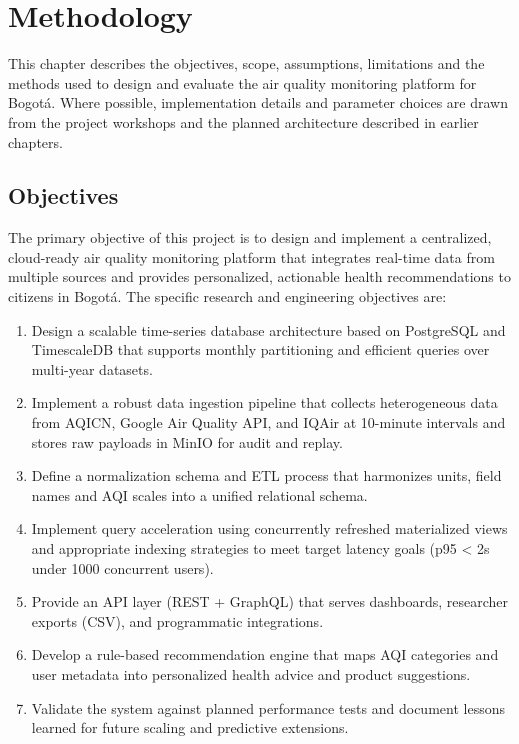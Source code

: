 \chapter{Methodology}
\label{ch:method} %

This chapter describes the objectives, scope, assumptions, limitations and the methods used to design and evaluate the air quality monitoring platform for Bogotá. Where possible, implementation details and parameter choices are drawn from the project workshops and the planned architecture described in earlier chapters.

\section{Objectives}
\label{sec:method_objectives}

The primary objective of this project is to design and implement a centralized, cloud-ready air quality monitoring platform that integrates real-time data from multiple sources and provides personalized, actionable health recommendations to citizens in Bogotá. The specific research and engineering objectives are:
\begin{enumerate}
    \item Design a scalable time-series database architecture based on PostgreSQL and TimescaleDB that supports monthly partitioning and efficient queries over multi-year datasets.
    \item Implement a robust data ingestion pipeline that collects heterogeneous data from AQICN, Google Air Quality API, and IQAir at 10-minute intervals and stores raw payloads in MinIO for audit and replay.
    \item Define a normalization schema and ETL process that harmonizes units, field names and AQI scales into a unified relational schema.
    \item Implement query acceleration using concurrently refreshed materialized views and appropriate indexing strategies to meet target latency goals (p95 < 2s under 1000 concurrent users).
    \item Provide an API layer (REST + GraphQL) that serves dashboards, researcher exports (CSV), and programmatic integrations.
    \item Develop a rule-based recommendation engine that maps AQI categories and user metadata into personalized health advice and product suggestions.
    \item Validate the system against planned performance tests and document lessons learned for future scaling and predictive extensions.
\end{enumerate}

